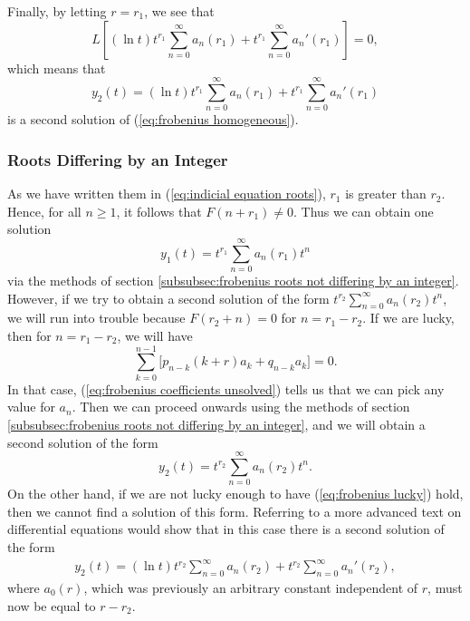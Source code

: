 \documentclass{myart}
\newcommand{\eq}[1]{(\ref{eq:#1})}
\begin{document}
Finally, by letting $r = r_1$, we see that
\begin{equation*}
    L\left[(\ln t) t^{r_1} \sum_{n=0}^\infty a_n(r_1)
  + t^{r_1} \sum_{n=0}^\infty a_n'(r_1)\right]
  = 0,
\end{equation*}
which means that
\begin{equation*}
    y_2(t)
  = (\ln t) t^{r_1} \sum_{n=0}^\infty a_n(r_1)
  + t^{r_1} \sum_{n=0}^\infty a_n'(r_1)
\end{equation*}
is a second solution of \eq{frobenius homogeneous}.

\subsubsection{Roots Differing by an Integer}
\label{subsubsec:frobenius roots differing by an integer}

As we have written them in \eq{indicial equation roots}, $r_1$ is
greater than $r_2$. Hence, for all $n \geq 1$, it follows that $F(n +
r_1) \neq 0$. Thus we can obtain one solution
\begin{equation*}
  y_1(t) = t^{r_1} \sum_{n=0}^\infty a_n(r_1) t^n
\end{equation*}
via the methods of section \ref{subsubsec:frobenius roots not
  differing by an integer}. However, if we try to obtain a second
solution of the form $t^{r_2} \sum_{n=0}^\infty a_n(r_2) t^n$, we will
run into trouble because $F(r_2 + n) = 0$ for $n = r_1 - r_2$. If we
are lucky, then for $n = r_1 - r_2$, we will have
\begin{equation} \label{eq:frobenius lucky}
  \sum_{k=0}^{n-1} \Big[p_{n-k} (k+r) a_k + q_{n-k} a_k\Big] = 0.
\end{equation}
In that case, \eq{frobenius coefficients unsolved} tells us that we
can pick any value for $a_n$. Then we can proceed onwards using the
methods of section \ref{subsubsec:frobenius roots not differing by an
  integer}, and we will obtain a second solution of the form
\begin{equation*}
  y_2(t) = t^{r_2} \sum_{n=0}^\infty a_n(r_2) t^n.
\end{equation*}
On the other hand, if we are not lucky enough to have \eq{frobenius
  lucky} hold, then we cannot find a solution of this form. Referring
to a more advanced text on differential equations would show that in
this case there is a second solution of the form
\begin{align*}
    y_2(t)
  = (\ln t) t^{r_2} \sum_{n=0}^\infty a_n(r_2)
  + t^{r_2} \sum_{n=0}^\infty a_n'(r_2),
\end{align*}
where $a_0(r)$, which was previously an arbitrary constant independent
of $r$, must now be equal to $r - r_2$.
\end{document}
